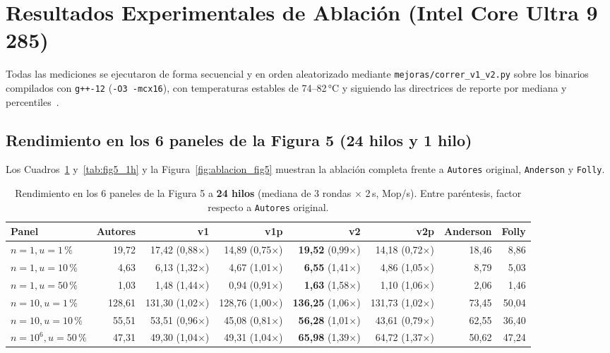 \documentclass[11pt,a4paper]{article}
\begin{document}
\section{Resultados Experimentales de Ablación (Intel Core Ultra 9 285)}

Todas las mediciones se ejecutaron de forma secuencial y en orden aleatorizado mediante \texttt{mejoras/correr\_v1\_v2.py} sobre los binarios compilados con \texttt{g++-12} (\texttt{-O3 -mcx16}), con temperaturas estables de 74--82\,°C y siguiendo las directrices de reporte por mediana y percentiles~\cite{hoefler2015benchmarking}.

\subsection{Rendimiento en los 6 paneles de la Figura 5 (24 hilos y 1 hilo)}

Los Cuadros~\ref{tab:fig5_24h} y~\ref{tab:fig5_1h} y la Figura~\ref{fig:ablacion_fig5} muestran la ablación completa frente a \texttt{Autores} original, \texttt{Anderson} y \texttt{Folly}.

\begin{table}[H]
\centering
\caption{Rendimiento en los 6 paneles de la Figura 5 a \textbf{24 hilos} (mediana de 3 rondas $\times$ 2\,s, Mop/s). Entre paréntesis, factor respecto a \texttt{Autores} original.}
\label{tab:fig5_24h}
\footnotesize
\begin{tabular}{@{}l r r r r r r r@{}}
\toprule
\textbf{Panel} & \textbf{Autores} & \textbf{v1} & \textbf{v1p} & \textbf{v2} & \textbf{v2p} & \textbf{Anderson} & \textbf{Folly} \\
\midrule
$n=1, u=1\,\%$ & 19{,}72 & 17{,}42 (0{,}88$\times$) & 14{,}89 (0{,}75$\times$) & \textbf{19{,}52} (0{,}99$\times$) & 14{,}18 (0{,}72$\times$) & 18{,}46 & 8{,}86 \\
$n=1, u=10\,\%$ & 4{,}63 & 6{,}13 (1{,}32$\times$) & 4{,}67 (1{,}01$\times$) & \textbf{6{,}55} (1{,}41$\times$) & 4{,}86 (1{,}05$\times$) & 8{,}79 & 5{,}03 \\
$n=1, u=50\,\%$ & 1{,}03 & 1{,}48 (1{,}44$\times$) & 0{,}94 (0{,}91$\times$) & \textbf{1{,}63} (1{,}58$\times$) & 1{,}10 (1{,}06$\times$) & 2{,}06 & 1{,}46 \\
$n=10, u=1\,\%$ & 128{,}61 & 131{,}30 (1{,}02$\times$) & 128{,}76 (1{,}00$\times$) & \textbf{136{,}25} (1{,}06$\times$) & 131{,}73 (1{,}02$\times$) & 73{,}45 & 50{,}04 \\
$n=10, u=10\,\%$ & 55{,}51 & 53{,}51 (0{,}96$\times$) & 45{,}08 (0{,}81$\times$) & \textbf{56{,}28} (1{,}01$\times$) & 43{,}61 (0{,}79$\times$) & 62{,}55 & 36{,}40 \\
$n=10^6, u=50\,\%$ & 47{,}31 & 49{,}30 (1{,}04$\times$) & 49{,}31 (1{,}04$\times$) & \textbf{65{,}98} (1{,}39$\times$) & 64{,}72 (1{,}37$\times$) & 50{,}62 & 47{,}24 \\
\bottomrule
\end{tabular}
\end{table}
\end{document}
